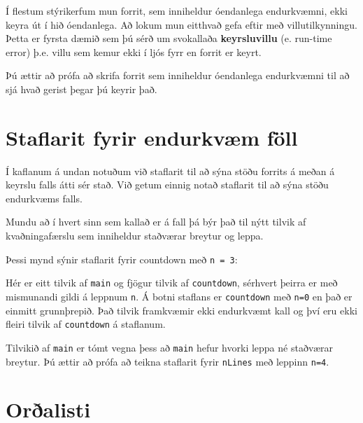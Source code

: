 Í flestum stýrikerfum mun forrit, sem inniheldur óendanlega endurkvæmni, ekki keyra út í hið óendanlega.
Að lokum mun eitthvað gefa eftir með villutilkynningu.
Þetta er fyrsta dæmið sem þú sérð um svokallaða {\bf keyrsluvillu} (e. run-time error) þ.e. villu sem kemur ekki í ljós fyrr en forrit er keyrt.

Þú ættir að prófa að skrifa forrit sem inniheldur óendanlega endurkvæmni til að sjá hvað gerist þegar þú keyrir það.

\section {Staflarit fyrir endurkvæm föll}

Í kaflanum á undan notuðum við staflarit til að sýna stöðu forrits á meðan á keyrslu falls átti sér stað.
Við getum einnig notað staflarit til að sýna stöðu endurkvæms falls.

Mundu að í hvert sinn sem kallað er á fall þá býr það til nýtt tilvik af kvaðningafærslu sem inniheldur staðværar breytur og leppa.

Þessi mynd sýnir staflarit fyrir countdown með {\tt n = 3}:

\vspace{0.1in}
\centerline{}
\vspace{0.1in}
%
Hér er eitt tilvik af {\tt main} og fjögur tilvik af {\tt countdown}, sérhvert þeirra er með mismunandi gildi á leppnum {\tt n}.
Á botni staflans er {\tt countdown} með {\tt n=0} en það er einmitt grunnþrepið.
Það tilvik framkvæmir ekki endurkvæmt kall og því eru ekki fleiri tilvik af {\tt countdown} á staflanum.

Tilvikið af {\tt main} er tómt vegna þess að {\tt main} hefur hvorki leppa né staðværar breytur.
Þú ættir að prófa að teikna staflarit fyrir {\tt nLines} með leppinn {\tt n=4}.


\section{Orðalisti}


